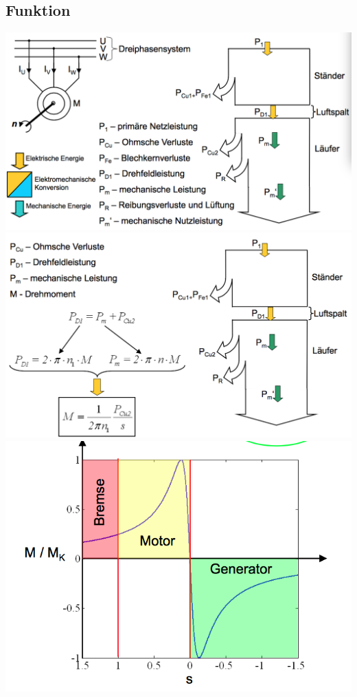 \subsection{Funktion}
\begin{minipage}{0.3 \linewidth}
\includegraphics[width = \linewidth]{./Pics/VL1213/Funktion}
\includegraphics[width = \linewidth]{./Pics/VL1213/Funktion2}
\includegraphics[width = \linewidth]{./Pics/VL1213/Funktion3}

\end{minipage}
